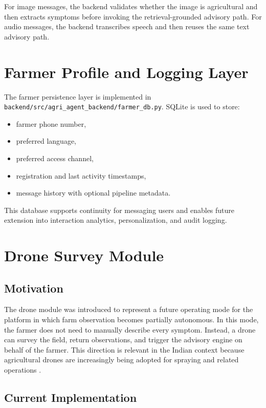 \documentclass[11pt,a4paper]{article}
\begin{document}
For image messages, the backend validates whether the image is agricultural and then extracts symptoms before invoking the retrieval-grounded advisory path. For audio messages, the backend transcribes speech and then reuses the same text advisory path.

\section{Farmer Profile and Logging Layer}

The farmer persistence layer is implemented in \texttt{backend/src/agri\_agent\_backend/farmer\_db.py}. SQLite is used to store:

\begin{itemize}
  \item farmer phone number,
  \item preferred language,
  \item preferred access channel,
  \item registration and last activity timestamps,
  \item message history with optional pipeline metadata.
\end{itemize}

This database supports continuity for messaging users and enables future extension into interaction analytics, personalization, and audit logging.

\section{Drone Survey Module}

\subsection{Motivation}

The drone module was introduced to represent a future operating mode for the platform in which farm observation becomes partially autonomous. In this mode, the farmer does not need to manually describe every symptom. Instead, a drone can survey the field, return observations, and trigger the advisory engine on behalf of the farmer. This direction is relevant in the Indian context because agricultural drones are increasingly being adopted for spraying and related operations \cite{pib-drone-didi}.

\subsection{Current Implementation}
\end{document}
